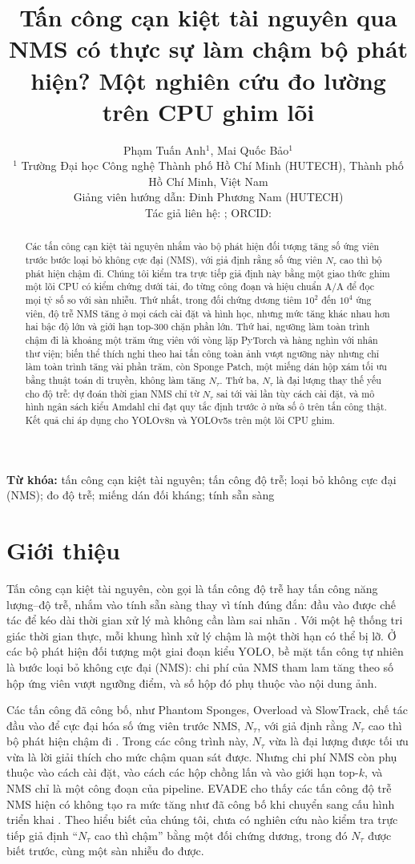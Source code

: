 \documentclass[12pt,a4paper]{article}
\title{Tấn công cạn kiệt tài nguyên qua NMS có thực sự làm chậm bộ phát hiện? Một nghiên cứu đo lường trên CPU ghim lõi}
\author{Phạm Tuấn Anh$^{1}$, Mai Quốc Bảo$^{1}$\\
{\small $^{1}$ Trường Đại học Công nghệ Thành phố Hồ Chí Minh (HUTECH), Thành phố Hồ Chí Minh, Việt Nam}\\
{\small Giảng viên hướng dẫn: Đinh Phương Nam (HUTECH)}\\
{\small Tác giả liên hệ: \todo{nhóm quyết định tác giả liên hệ và email}; ORCID: \todo{ORCID của từng tác giả}}}
\date{}
\newcommand{\Ntau}{N_{\tau}}
\begin{document}
\maketitle

\begin{abstract}
Các tấn công cạn kiệt tài nguyên nhắm vào bộ phát hiện đối tượng tăng số ứng viên trước bước loại bỏ không cực đại (NMS), với giả định rằng số ứng viên $\Ntau$ cao thì bộ phát hiện chậm đi. Chúng tôi kiểm tra trực tiếp giả định này bằng một giao thức ghim một lõi CPU có kiểm chứng dưới tải, đo từng công đoạn và hiệu chuẩn A/A để đọc mọi tỷ số so với sàn nhiễu. Thứ nhất, trong đối chứng dương tiêm $10^2$ đến $10^4$ ứng viên, độ trễ NMS tăng ở mọi cách cài đặt và hình học, nhưng mức tăng khác nhau hơn hai bậc độ lớn và giới hạn top-300 chặn phần lớn. Thứ hai, ngưỡng làm toàn trình chậm đi là khoảng một trăm ứng viên với vòng lặp PyTorch và hàng nghìn với nhân thư viện; biến thể thích nghi theo hai tấn công toàn ảnh vượt ngưỡng này nhưng chỉ làm toàn trình tăng vài phần trăm, còn Sponge Patch, một miếng dán hộp xám tối ưu bằng thuật toán di truyền, không làm tăng $\Ntau$. Thứ ba, $\Ntau$ là đại lượng thay thế yếu cho độ trễ: dự đoán thời gian NMS chỉ từ $\Ntau$ sai tới vài lần tùy cách cài đặt, và mô hình ngân sách kiểu Amdahl chỉ đạt quy tắc định trước ở nửa số ô trên tấn công thật. Kết quả chỉ áp dụng cho YOLOv8n và YOLOv5s trên một lõi CPU ghim.
\end{abstract}

\noindent\textbf{Từ khóa:} tấn công cạn kiệt tài nguyên; tấn công độ trễ; loại bỏ không cực đại (NMS); đo độ trễ; miếng dán đối kháng; tính sẵn sàng

\section{Giới thiệu}
Tấn công cạn kiệt tài nguyên, còn gọi là tấn công độ trễ hay tấn công năng lượng--độ trễ, nhắm vào tính sẵn sàng thay vì tính đúng đắn: đầu vào được chế tác để kéo dài thời gian xử lý mà không cần làm sai nhãn \cite{shumailov2021sponge,nicgslowdown2022}. Với một hệ thống tri giác thời gian thực, mỗi khung hình xử lý chậm là một thời hạn có thể bị lỡ. Ở các bộ phát hiện đối tượng một giai đoạn kiểu YOLO, bề mặt tấn công tự nhiên là bước loại bỏ không cực đại (NMS): chi phí của NMS tham lam tăng theo số hộp ứng viên vượt ngưỡng điểm, và số hộp đó phụ thuộc vào nội dung ảnh.

Các tấn công đã công bố, như Phantom Sponges, Overload và SlowTrack, chế tác đầu vào để cực đại hóa số ứng viên trước NMS, $\Ntau$, với giả định rằng $\Ntau$ cao thì bộ phát hiện chậm đi \cite{phantom2023,overload2024,slowtrack2024}. Trong các công trình này, $\Ntau$ vừa là đại lượng được tối ưu vừa là lời giải thích cho mức chậm quan sát được. Nhưng chi phí NMS còn phụ thuộc vào cách cài đặt, vào cách các hộp chồng lấn và vào giới hạn top-$k$, và NMS chỉ là một công đoạn của pipeline. EVADE cho thấy các tấn công độ trễ NMS hiện có không tạo ra mức tăng như đã công bố khi chuyển sang cấu hình triển khai \cite{evade2025}. Theo hiểu biết của chúng tôi, chưa có nghiên cứu nào kiểm tra trực tiếp giả định ``$\Ntau$ cao thì chậm'' bằng một đối chứng dương, trong đó $\Ntau$ được biết trước, cùng một sàn nhiễu đo được.
\end{document}
